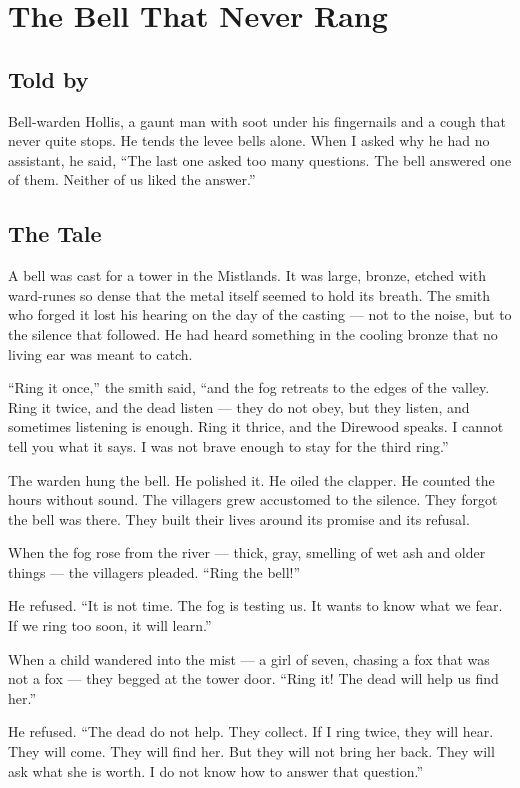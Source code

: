 \chapter{The Bell That Never Rang}

\section*{Told by}
Bell-warden Hollis, a gaunt man with soot under his fingernails and a cough that never quite stops. He tends the levee bells alone. When I asked why he had no assistant, he said, ``The last one asked too many questions. The bell answered one of them. Neither of us liked the answer.''

\section*{The Tale}

A bell was cast for a tower in the Mistlands. It was large, bronze, etched with ward-runes so dense that the metal itself seemed to hold its breath. The smith who forged it lost his hearing on the day of the casting --- not to the noise, but to the silence that followed. He had heard something in the cooling bronze that no living ear was meant to catch.

``Ring it once,'' the smith said, ``and the fog retreats to the edges of the valley. Ring it twice, and the dead listen --- they do not obey, but they listen, and sometimes listening is enough. Ring it thrice, and the Direwood speaks. I cannot tell you what it says. I was not brave enough to stay for the third ring.''

The warden hung the bell. He polished it. He oiled the clapper. He counted the hours without sound. The villagers grew accustomed to the silence. They forgot the bell was there. They built their lives around its promise and its refusal.

When the fog rose from the river --- thick, gray, smelling of wet ash and older things --- the villagers pleaded. ``Ring the bell!''

He refused. ``It is not time. The fog is testing us. It wants to know what we fear. If we ring too soon, it will learn.''

When a child wandered into the mist --- a girl of seven, chasing a fox that was not a fox --- they begged at the tower door. ``Ring it! The dead will help us find her.''

He refused. ``The dead do not help. They collect. If I ring twice, they will hear. They will come. They will find her. But they will not bring her back. They will ask what she is worth. I do not know how to answer that question.''

